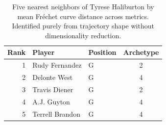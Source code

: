 \begin{table}[htbp]
  \centering\small
  \begin{tabular}{rllc}
    \toprule
    Rank & Player & Position & Archetype \\
    \midrule
    1 & Rudy Fernandez & G & 2 \\
    2 & Delonte West & G & 4 \\
    3 & Travis Diener & G & 2 \\
    4 & A.J. Guyton & G & 4 \\
    5 & Terrell Brandon & G & 4 \\
    \bottomrule
  \end{tabular}
  \caption{Five nearest neighbors of Tyrese Haliburton by mean Fr\'{e}chet curve distance across metrics. Identified purely from trajectory shape without dimensionality reduction.}
  \label{tab:Tyrese_Haliburton_frechet_curve_neighbors}
\end{table}

